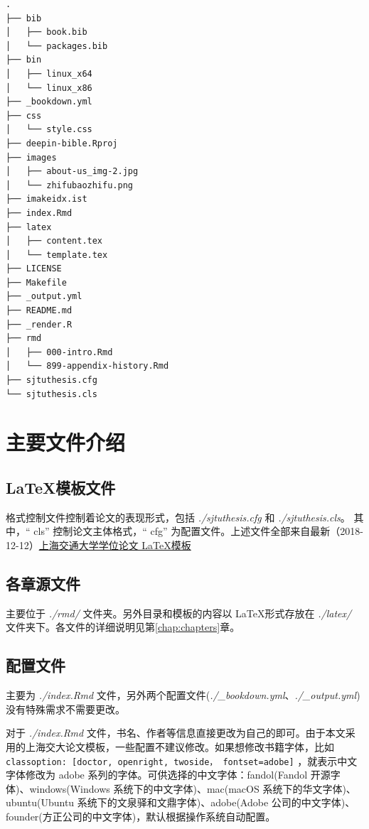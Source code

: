 \documentclass[doctor,openright,twoside]{sjtuthesis}
\newcommand{\passthrough}[1]{#1}
\theoremstyle{plain}
\theoremstyle{definition}
\theoremstyle{remark}
\theoremstyle{ocrenumbox}
\theoremstyle{plain}
\begin{document}
\begin{lstlisting}[caption=模板文件布局, label={intro:folder}, numbers=none]
.
├── bib
│   ├── book.bib
│   └── packages.bib
├── bin
│   ├── linux_x64
│   └── linux_x86
├── _bookdown.yml
├── css
│   └── style.css
├── deepin-bible.Rproj
├── images
│   ├── about-us_img-2.jpg
│   └── zhifubaozhifu.png
├── imakeidx.ist
├── index.Rmd
├── latex
│   ├── content.tex
│   └── template.tex
├── LICENSE
├── Makefile
├── _output.yml
├── README.md
├── _render.R
├── rmd
│   ├── 000-intro.Rmd
│   └── 899-appendix-history.Rmd
├── sjtuthesis.cfg
└── sjtuthesis.cls
\end{lstlisting}

\hypertarget{section-147}{%
\section{主要文件介绍}\label{section-147}}

\hypertarget{section-148}{%
\subsection{\texorpdfstring{\LaTeX 模板文件}{模板文件}}\label{section-148}}

格式控制文件控制着论文的表现形式，包括 \emph{./sjtuthesis.cfg} 和 \emph{./sjtuthesis.cls}。
其中，`` cls'' 控制论文主体格式，`` cfg'' 为配置文件。上述文件全部来自最新（2018-12-12）\href{https://github.com/sjtug/SJTUThesis}{上海交通大学学位论文 \LaTeX 模板}

\hypertarget{section-149}{%
\subsection{各章源文件}\label{section-149}}

主要位于 \emph{./rmd/} 文件夹。另外目录和模板的内容以 \LaTeX 形式存放在 \emph{./latex/} 文件夹下。各文件的详细说明见第\ref{chap:chapters}章。

\hypertarget{section-150}{%
\subsection{配置文件}\label{section-150}}

主要为 \emph{./index.Rmd} 文件，另外两个配置文件(\emph{./\_bookdown.yml}、\emph{./\_output.yml})没有特殊需求不需要更改。

对于 \emph{./index.Rmd} 文件，书名、作者等信息直接更改为自己的即可。由于本文采用的上海交大论文模板，一些配置不建议修改。如果想修改书籍字体，比如 \passthrough{\lstinline!classoption: [doctor, openright, twoside， fontset=adobe]!} ，就表示中文字体修改为 adobe 系列的字体。可供选择的中文字体：fandol(Fandol 开源字体)、windows(Windows 系统下的中文字体)、mac(macOS 系统下的华文字体)、ubuntu(Ubuntu 系统下的文泉驿和文鼎字体)、adobe(Adobe 公司的中文字体)、founder(方正公司的中文字体)，默认根据操作系统自动配置。
\end{document}
